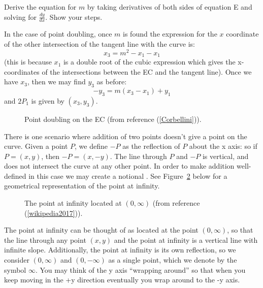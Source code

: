 \begin{exercise}\label{exercise:further_crypt:}
Derive the equation for $m$ by taking derivatives of both sides  of equation  E and solving for $\frac{dy}{dx}$. Show your steps.
\end{exercise}

In the case of point doubling, once $m$ is found the expression for  the $x$ coordinate of the other intersection of the tangent line with the curve is:
\[ x_3 = m^2 - x_1 - x_1\]
(this is because $x_1$ is a double root of the cubic expression which gives the x-coordinates of the intersections between the EC and the tangent line). Once we have $x_3$, then we may find $y_3$ as before:
\[ -y_3 = m(x_3-x_1) + y_1 \]
and $2P_1$ is given by $(x_3,y_3)$.

\begin{figure}[htbp]
	  \caption{\label{fig:DH:DHKE_7}Point doubling on the EC (from reference (\ref{Corbellini})).}
\end{figure}
There is one scenario where addition of two points doesn't give a point on the curve. Given a point $P$, we define  $-P$ as the reflection of $P$ about the x axis: so  if $P = (x, y)$, then $-P = (x, -y)$. The line through $P$ and $-P$ is vertical, and does not intersect the curve at any other point.  In order to make addition well-defined in this case we may create a notional . See Figure~\ref{fig:DH:DHKE_19} below for a geometrical representation of the point at infinity.
\begin{figure}[htbp]
	  \caption{\label{fig:DH:DHKE_19}The point at infinity located at $(0,\infty)$ (from reference (\ref{wikipedia2017})).}
\end{figure}
The point at infinity can be thought of as located at the point $(0,\infty)$, so that the line through any point $(x, y)$ and the point at infinity is a vertical line with infinite slope. Additionally, the point at infinity is its own reflection, so we consider $(0,\infty)$ and $(0,-\infty)$ as a single point, which we denote by the symbol $\infty$. You may think of the y  axis ``wrapping around'' so that when you keep moving in the +y direction eventually you wrap around to the -y axis.
